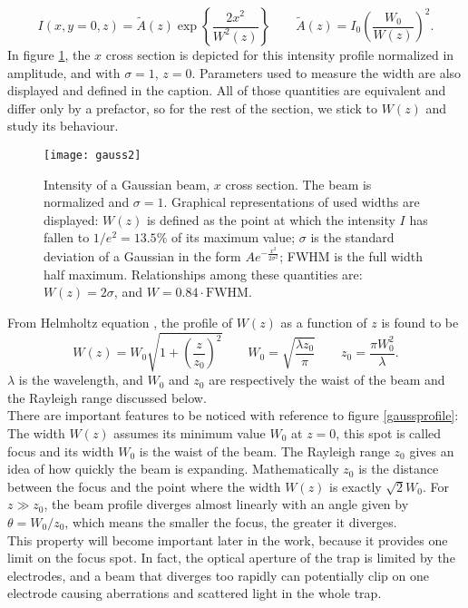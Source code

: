 \begin{equation}
I(x,y=0,z) = \widetilde{A}(z) \exp\left\{\frac{2x^2}{W^2(z)}\right\} \qquad \widetilde{A}(z) = I_0 \left(\frac{W_0}{W(z)}\right)^2  .
\end{equation}
In figure \ref{gauss}, the $x$ cross section is depicted for this intensity profile normalized in amplitude, and with $\sigma = 1$, $z=0$. Parameters used to measure the width are also displayed and defined in the caption. All of those quantities are equivalent and differ only by a prefactor, so for the rest of the section, we stick to $W(z)$ and study its behaviour.
\begin{figure}
\centering
\texttt{[image: gauss2]}
\caption{Intensity of a Gaussian beam, $x$ cross section. The beam is normalized and $\sigma=1$. Graphical representations of used widths are displayed: $W(z)$ is defined as the point at which the intensity $I$ has fallen to $1/e^2 = 13.5\%$ of its maximum value; $\sigma$ is the standard deviation of a Gaussian in the form $Ae^{-\frac{x^2}{2\sigma^2}}$; FWHM is the full width half maximum. Relationships among these quantities are: $W(z) = 2\sigma$, and $W = 0.84\cdot \text{FWHM}$.}
\label{gauss}
\end{figure}
From Helmholtz equation \cite{saleh}, the profile of $W(z)$ as a function of $z$ is found to be
\begin{equation}
\label{waistprofile}
W(z) = W_0 \sqrt{1 + \left(\frac{z}{z_0}\right)^2}\qquad W_0 = \sqrt{\frac{\lambda z_0}{\pi}} \qquad z_0 = \frac{\pi W_0^2}{\lambda}.
\end{equation}
$\lambda$ is the wavelength, and $W_0$ and $z_0$ are respectively the waist of the beam and the Rayleigh range discussed below.\\
There are important features to be noticed with reference to figure \eqref{gaussprofile}:
The width $W(z)$ assumes its minimum value $W_0$ at $z=0$, this spot is called focus and its width $W_0$ is the waist of the beam. The Rayleigh range $z_0$ gives an idea of how quickly the beam is expanding. Mathematically $z_0$ is the distance between the focus and the point where the width $W(z)$ is exactly $\sqrt{2}W_0$.
For $z \gg z_0$, the beam profile diverges almost linearly with an angle given by $\theta = W_0/z_0$, which means the smaller the focus, the greater it diverges.\\
This property will become important later in the work, because it provides one limit on the focus spot. In fact, the optical aperture of the trap is limited by the electrodes, and a beam that diverges too rapidly can potentially clip on one electrode causing aberrations and scattered light in the whole trap.\\

